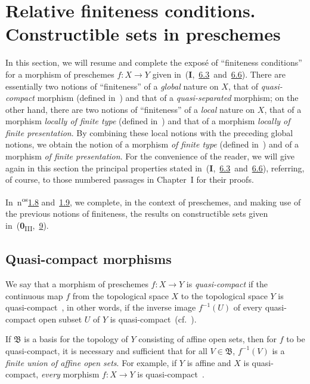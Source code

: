 \section{Relative finiteness conditions. Constructible sets in preschemes}
\label{section:IV.1}

In this section, we will resume and complete the expos\'e of ``finiteness conditions'' for a morphism of preschemes $f:X\to Y$ given in~(\textbf{I},~\hyperref[subsection:I.6.3]{6.3}~and~\hyperref[subsection:I.6.6]{6.6}).
There are essentially two notions of ``finiteness'' of a \emph{global} nature on $X$, that of \emph{quasi-compact} morphism (defined in~) and that of a \emph{quasi-separated} morphism; on the other hand, there are two notions of ``finiteness'' of a \emph{local} nature on $X$, that of a morphism \emph{locally of finite type} (defined in~) and that of a morphism \emph{locally of finite presentation}.
By combining these local notions with the preceding global notions, we obtain the notion of a morphism \emph{of finite type} (defined in~) and of a morphism \emph{of finite presentation}.
For the convenience of the reader, we will give again in this section the principal properties stated in~(\textbf{I},~\hyperref[subsection:I.6.3]{6.3}~and~\hyperref[subsection:I.6.6]{6.6}), referring, of course, to those numbered passages in Chapter~I for their proofs.

In~n\textsuperscript{os}\hyperref[subsection:IV.1.8]{1.8} and~\hyperref[subsection:IV.1.9]{1.9}, we complete, in the context of preschemes, and making use of the previous notions of finiteness, the results on constructible sets given in~(\textbf{0}\textsubscript{III},~\textsection\hyperref[section:0.9]{9}).

\subsection{Quasi-compact morphisms}
\label{subsection:IV.1.1}

\begin{definition}[1.1.1]
\label{IV.1.1.1}
We say that a morphism of preschemes $f:X\to Y$ is \emph{quasi-compact} if the continuous map $f$ from the topological space $X$ to the topological space $Y$ is quasi-compact~, in other words, if the inverse image $f^{-1}(U)$ of every quasi-compact open subset $U$ of $Y$ is quasi-compact~(cf.~).
\end{definition}

If $\mathfrak{B}$ is a basis for the topology of $Y$ consisting of affine open sets, then for $f$ to be quasi-compact, it is necessary and sufficient that for all $V\in\mathfrak{B}$, $f^{-1}(V)$ is a \emph{finite union of affine open sets}.
For example, if $Y$ is affine and $X$ is quasi-compact, \emph{every} morphism $f:X\to Y$ is quasi-compact~.


